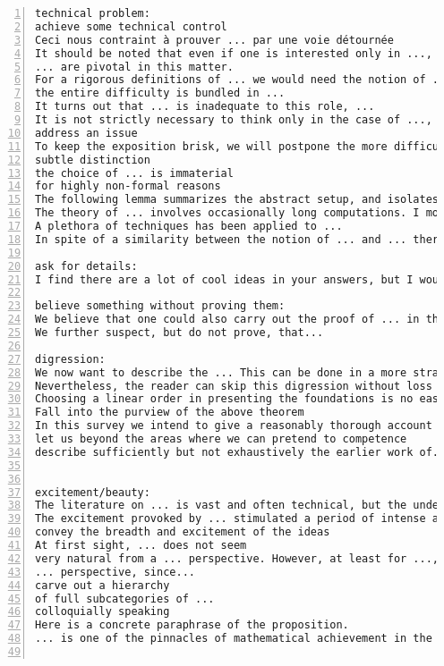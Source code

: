 \documentclass[11pt]{amsart}
\begin{document}
\begin{lstlisting}[numbers=left,numberstyle=\tiny,numbersep=10pt]
technical problem:
achieve some technical control
Ceci nous contraint à prouver ... par une voie détournée
It should be noted that even if one is interested only in ..., the proofs often involve more general ...
... are pivotal in this matter.
For a rigorous definitions of ... we would need the notion of ..., which would take us too far away from the subject of ...
the entire difficulty is bundled in ...
It turns out that ... is inadequate to this role, ...
It is not strictly necessary to think only in the case of ..., but it certainly allows one to ignore some technical difficulties.
address an issue
To keep the exposition brisk, we will postpone the more difficult proofs until ...
subtle distinction
the choice of ... is immaterial
for highly non-formal reasons
The following lemma summarizes the abstract setup, and isolates the key property that we need to prove in our situation.
The theory of ... involves occasionally long computations. I moved several of them to the end of .... The reader may want to do some of them as exercises without looking first at these appendices.
A plethora of techniques has been applied to ...
In spite of a similarity between the notion of ... and ... there are essential differences.

ask for details:
I find there are a lot of cool ideas in your answers, but I would be grateful if you could be a bit more precise.

believe something without proving them:
We believe that one could also carry out the proof of ... in the language of ..., but we  have not investigated the details.
We further suspect, but do not prove, that...

digression:
We now want to describe the ... This can be done in a more straightforward way, but we prefer to include a short digression in ... theory as this allows us to mention a general fact which is in the background of a later construction anyhow.
Nevertheless, the reader can skip this digression without loss of continuity and continue with ... instead.
Choosing a linear order in presenting the foundations is no easy task.
Fall into the purview of the above theorem
In this survey we intend to give a reasonably thorough account of the recent work, though mostly without detailed proofs
let us beyond the areas where we can pretend to competence
describe sufficiently but not exhaustively the earlier work of...


excitement/beauty:
The literature on ... is vast and often technical, but the underlying ideas are possessing of an undeniable beauty.
The excitement provoked by ... stimulated a period of intense and widespread activity.
convey the breadth and excitement of the ideas
At first sight, ... does not seem
very natural from a ... perspective. However, at least for ..., ... is important from
... perspective, since...
carve out a hierarchy
of full subcategories of ...
colloquially speaking
Here is a concrete paraphrase of the proposition.
... is one of the pinnacles of mathematical achievement in the 20th century.


\end{lstlisting}
\end{document}
